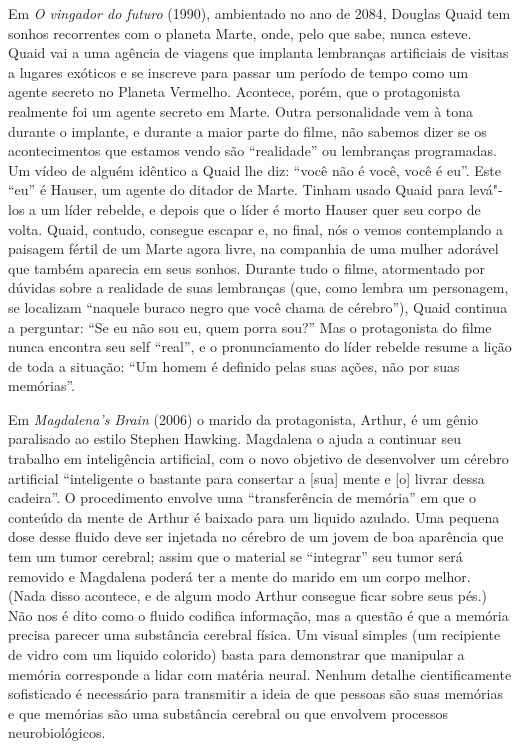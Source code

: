 Em \emph{O vingador do futuro} (1990), ambientado no ano de 2084,
Douglas Quaid tem sonhos recorrentes com o planeta Marte, onde, pelo que
sabe, nunca esteve. Quaid vai a uma agência de viagens que implanta
lembranças artificiais de visitas a lugares exóticos e se inscreve para
passar um período de tempo como um agente secreto no Planeta Vermelho.
Acontece, porém, que o protagonista realmente foi um agente secreto em
Marte. Outra personalidade vem à tona durante o implante, e durante a
maior parte do filme, não sabemos dizer se os acontecimentos que estamos
vendo são ``realidade'' ou lembranças programadas. Um vídeo de alguém
idêntico a Quaid lhe diz: ``você não é você, você é eu''. Este ``eu'' é
Hauser, um agente do ditador de Marte. Tinham usado Quaid para levá"-los
a um líder rebelde, e depois que o líder é morto Hauser quer seu corpo
de volta. Quaid, contudo, consegue escapar e, no final, nós o vemos
contemplando a paisagem fértil de um Marte agora livre, na companhia de
uma mulher adorável que também aparecia em seus sonhos. Durante tudo o
filme, atormentado por dúvidas sobre a realidade de suas lembranças
(que, como lembra um personagem, se localizam ``naquele buraco negro que
você chama de cérebro''), Quaid continua a perguntar: ``Se eu não sou
eu, quem porra sou?'' Mas o protagonista do filme nunca encontra seu
self ``real'', e o pronunciamento do líder rebelde resume a lição de
toda a situação: ``Um homem é definido pelas suas ações, não por suas
memórias''.

Em \emph{Magdalena's Brain} (2006) o marido da protagonista, Arthur, é
um gênio paralisado ao estilo Stephen Hawking. Magdalena o ajuda a
continuar seu trabalho em inteligência artificial, com o novo objetivo
de desenvolver um cérebro artificial ``inteligente o bastante para
consertar a {[}sua{]} mente e {[}o{]} livrar dessa cadeira''. O
procedimento envolve uma ``transferência de memória'' em que o conteúdo
da mente de Arthur é baixado para um liquido azulado. Uma pequena dose
desse fluido deve ser injetada no cérebro de um jovem de boa aparência
que tem um tumor cerebral; assim que o material se ``integrar'' seu
tumor será removido e Magdalena poderá ter a mente do marido em um corpo
melhor. (Nada disso acontece, e de algum modo Arthur consegue ficar
sobre seus pés.) Não nos é dito como o fluido codifica informação, mas a
questão é que a memória precisa parecer uma substância cerebral física.
Um visual simples (um recipiente de vidro com um liquido colorido) basta
para demonstrar que manipular a memória corresponde a lidar com matéria
neural. Nenhum detalhe cientificamente sofisticado é necessário para
transmitir a ideia de que pessoas são suas memórias e que memórias são
uma substância cerebral ou que envolvem processos neurobiológicos.

